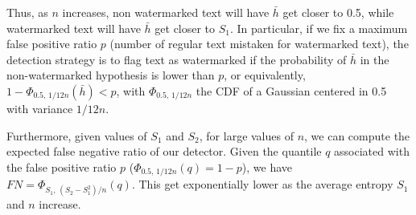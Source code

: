 Thus, as $n$ increases, non watermarked text will have $\bar{h}$ get closer to 0.5, while watermarked text will have $\bar{h}$ get closer to $S_1$. In particular, if we fix a maximum false positive ratio $p$ (number of regular text mistaken for watermarked text), the detection strategy is to flag text as watermarked if the probability of $\bar{h}$ in the non-watermarked hypothesis is lower than $p$, or equivalently, $1-\Phi_{0.5,\,1/12n}\left(\bar{h}\right) < p$, with $\Phi_{0.5,\, 1/12n}$ the CDF of a Gaussian centered in 0.5 with variance $1/12n$.

Furthermore, given values of $S_1$ and $S_2$, for large values of $n$, we can compute the expected false negative ratio of our detector. Given the quantile $q$ associated with the false positive ratio $p$ ($\Phi_{0.5,\,1/12n}\left(q\right) = 1-p$), we have $FN = \Phi_{S_1,\,(S_2-S_1^2)/n}(q)$. This get exponentially lower as the average entropy $S_1$ and $n$ increase.


